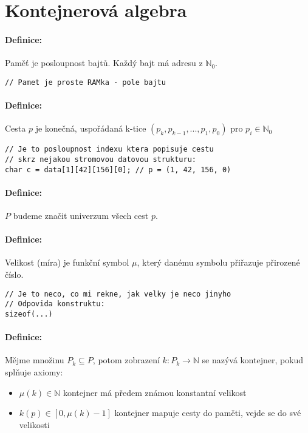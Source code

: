 \documentclass[a4paper,12pt]{article}
\begin{document}
\section{Kontejnerová algebra}

\paragraph{Definice:} Paměť je posloupnost bajtů. Každý bajt má adresu z $\mathbb{N}_0$.

\begin{lstlisting}
// Pamet je proste RAMka - pole bajtu
\end{lstlisting}

\paragraph{Definice:} Cesta $p$ je konečná, uspořádaná k-tice $(p_k, p_{k-1}, ..., p_1, p_0)$ pro $p_i \in \mathbb{N}_0$

\begin{lstlisting}
// Je to posloupnost indexu ktera popisuje cestu
// skrz nejakou stromovou datovou strukturu:
char c = data[1][42][156][0]; // p = (1, 42, 156, 0)
\end{lstlisting}

\paragraph{Definice:} $P$ budeme značit univerzum všech cest $p$.

\paragraph{Definice:} Velikost (míra) je funkční symbol $\mu$, který danému symbolu přiřazuje přirozené číslo.

\begin{lstlisting}
// Je to neco, co mi rekne, jak velky je neco jinyho
// Odpovida konstruktu:
sizeof(...)
\end{lstlisting}

\paragraph{Definice:} Mějme množinu $P_k \subseteq P$, potom zobrazení $k: P_k \to \mathbb{N}$ se nazývá kontejner, pokud splňuje axiomy:

\begin{itemize}
    \item $\mu(k) \in \mathbb{N}$ \qquad kontejner má předem známou konstantní velikost
    \item $k(p) \in [0, \mu(k) - 1]$ \qquad kontejner mapuje cesty do paměti, vejde se do své velikosti
\end{itemize}
\end{document}
